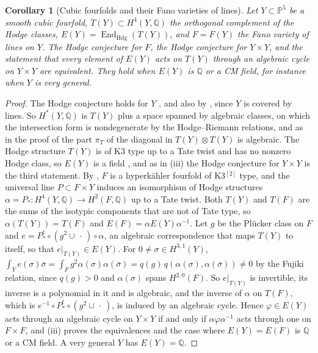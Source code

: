 \documentclass[11pt,reqno]{amsart}
\theoremstyle{plain}
\newtheorem{corollary}[theorem]{Corollary}
\theoremstyle{definition}
\theoremstyle{remark}
\newcommand{\QQ}{\mathbb{Q}}
\newcommand{\PP}{\mathbb{P}}
\DeclareMathOperator{\End}{End}
\begin{document}
\begin{corollary}[Cubic fourfolds and their Fano varieties of lines]
\label{cor:fanolines}
Let $Y\subset\PP^{5}$ be a smooth cubic fourfold, $T(Y)\subset
H^{4}(Y,\QQ)$ the orthogonal complement of the Hodge classes,
$E(Y)=\End_{\mathrm{Hdg}}(T(Y))$, and $F=F(Y)$ the Fano variety of lines on
$Y$. The Hodge conjecture for $F$, the Hodge conjecture for $Y\times Y$, and
the statement that every element of $E(Y)$ acts on $T(Y)$ through an
algebraic cycle on $Y\times Y$ are equivalent. They hold when $E(Y)$ is $\QQ$
or a CM field, for instance when $Y$ is very general.
\end{corollary}

\begin{proof}
The Hodge conjecture holds for $Y$ \cite{Zuc77}, and also by
, since $Y$ is covered by lines. So $H^{*}(Y,\QQ)$
is $T(Y)$ plus a space spanned by algebraic classes, on which the intersection
form is nondegenerate by the Hodge--Riemann relations, and as in the proof of
 the part $\pi_{T}$ of the diagonal in
$T(Y)\otimes T(Y)$ is algebraic. The Hodge structure $T(Y)$ is of K3 type up
to a Tate twist and has no nonzero Hodge class, so $E(Y)$ is a field
\cite{Zar83}, and as in (iii) the Hodge conjecture for
$Y\times Y$ is the third statement. By \cite{BD85}, $F$ is a hyperk\"ahler
fourfold of K3$^{[2]}$ type, and the universal line $P\subset F\times Y$
induces an isomorphism of Hodge structures $\alpha=P_{*}\colon
H^{4}(Y,\QQ)\to H^{2}(F,\QQ)$ up to a Tate twist. Both $T(Y)$ and $T(F)$
are the sums of the isotypic components that are not of Tate type, so
$\alpha(T(Y))=T(F)$ and $E(F)=\alpha E(Y)\alpha^{-1}$. Let $g$ be the
Pl\"ucker class on $F$ and $e=P^{t}_{*}\circ(g^{2}\cup\,\cdot\,)
\circ\alpha$, an algebraic correspondence that maps $T(Y)$ to itself, so that
$e|_{T(Y)}\in E(Y)$. For $0\ne\sigma\in H^{3,1}(Y)$,
$\int_{Y}e(\sigma)\bar\sigma=\int_{F}g^{2}\alpha(\sigma)\alpha(\bar\sigma)
=q(g)\,q(\alpha(\sigma),\alpha(\bar\sigma))\ne0$ by the Fujiki relation, since
$q(g)>0$ and $\alpha(\sigma)$ spans $H^{2,0}(F)$. So $e|_{T(Y)}$ is
invertible, its inverse is a polynomial in it and is algebraic, and the
inverse of $\alpha$ on $T(F)$,
which is $e^{-1}\circ P^{t}_{*}\circ(g^{2}\cup\,\cdot\,)$, is induced by an
algebraic cycle. Hence $\varphi\in E(Y)$ acts through an algebraic cycle on
$Y\times Y$ if and only if $\alpha\varphi\alpha^{-1}$ acts through one on
$F\times F$, and (iii) proves the equivalences and the
case where $E(Y)=E(F)$ is $\QQ$ or a CM field. A very general $Y$ has
$E(Y)=\QQ$.
\end{proof}
\end{document}
